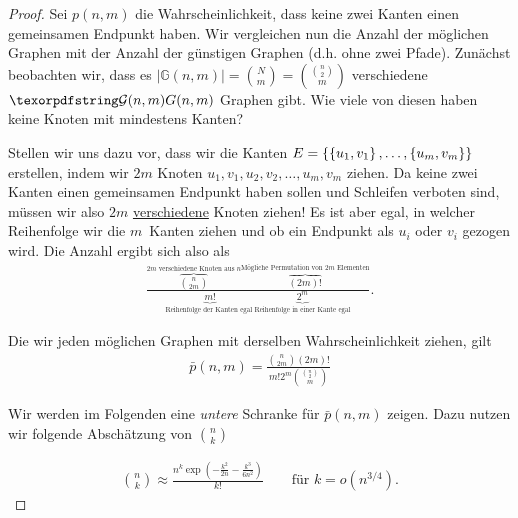\begin{proof}
    Sei $p(n,m)$ die Wahrscheinlichkeit, dass keine zwei Kanten einen gemeinsamen Endpunkt haben.
    Wir vergleichen nun die Anzahl der möglichen Graphen mit der Anzahl der günstigen Graphen (d.h. ohne zwei Pfade).
    Zunächst beobachten wir, dass es $|\mathbb G(n,m)| = \binom N m = \binom{\binom n 2}{m}$ verschiedene $\Gnm$ Graphen gibt.
    Wie viele von diesen haben keine Knoten mit mindestens Kanten?

    Stellen wir uns dazu vor, dass wir die Kanten $E = \left\{\left\{u_1, v_1\right\}, \ldots, \left\{u_m, v_m\right\}\right\}$ erstellen, indem wir $2m$ Knoten $u_1, v_1, u_2, v_2, \ldots, u_m, v_m$ ziehen.
    Da keine zwei Kanten einen gemeinsamen Endpunkt haben sollen und Schleifen verboten sind, müssen wir also $2m$ \underline{verschiedene} Knoten ziehen!
    Es ist aber egal, in welcher Reihenfolge wir die $m$~Kanten ziehen und ob ein Endpunkt als $u_i$ oder $v_i$ gezogen wird.
    Die Anzahl ergibt sich also als
    \begin{align}
        \frac{
            \overbrace{\binom{n}{2m}}^\text{$2m$ verschiedene Knoten aus $n$}
            \overbrace{(2m)!}^\text{Mögliche Permutation von $2m$ Elementen}
        }{
            \underbrace{m!}_\text{Reihenfolge der Kanten egal\ \ \ }
            \underbrace{2^m}_\text{Reihenfolge in einer Kante egal}
        }.
    \end{align}

    \noindent
    Die wir jeden möglichen Graphen mit derselben Wahrscheinlichkeit ziehen, gilt
    \begin{align}
        \bar p(n, m) = \frac{\binom{n}{2m} (2m)!}{m! 2^m \binom{\binom n 2}{m}} \label{eq:wkeit_keine_zwei_kanten}
    \end{align}

    \noindent
    Wir werden im Folgenden eine \emph{untere} Schranke für $\bar p(n,m)$ zeigen.
    Dazu nutzen wir folgende Abschätzung von $\binom n k$

    \begin{align}
        \binom n k \approx \frac{n^k \exp\left(-\frac{k^2}{2n} - \frac{k^3}{6n^2}\right)}{k!}
        \quad\quad \text{für } k = o(n^{3/4}).
    \end{align}


\end{proof}
